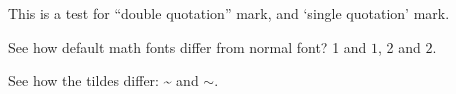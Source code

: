 \documentclass{article}
\begin{document}
\par
This is a test for ``double quotation'' mark, and `single quotation' mark.
\par
See how default math fonts differ from normal font? 1 and $1$, 2 and $2$.
\par
See how the tildes differ: \~{} and $\sim$.
\end{document}
